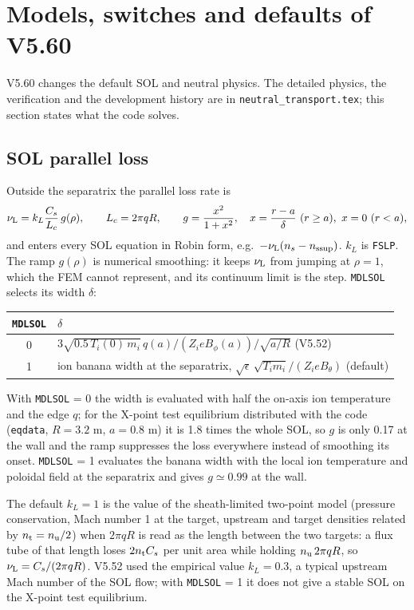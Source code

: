 \documentclass[11pt]{article}
\def\r#1{{\rm#1}}
\def\nsup#1{n_\r{#1sup}}
\def\nuL{\nu_\r{L}}
\begin{document}
\clearpage
\section{Models, switches and defaults of V5.60}
\setcounter{equation}{0}

V5.60 changes the default SOL and neutral physics.  The detailed physics,
the verification and the development history are in
\texttt{neutral\_transport.tex}; this section states what the code solves.

\subsection{SOL parallel loss}

Outside the separatrix the parallel loss rate is
\begin{equation}
  \nuL = k_L \frac{C_s}{L_c}\, g(\rho),\qquad L_c = 2\pi q R,\qquad
  g = \frac{x^2}{1+x^2},\quad x = \frac{r-a}{\delta}\ (r\ge a),\ x=0\ (r<a),
\end{equation}
and enters every SOL equation in Robin form, e.g.\ $-\nuL(n_s-\nsup{s})$.
$k_L$ is \texttt{FSLP}.  The ramp $g(\rho)$ is numerical smoothing: it keeps
$\nuL$ from jumping at $\rho=1$, which the FEM cannot represent, and its
continuum limit is the step.  \texttt{MDLSOL} selects its width $\delta$:

\begin{center}
\begin{tabular}{|c|l|}\hline
\texttt{MDLSOL} & $\delta$ \\\hline
0 & $3\sqrt{0.5\,T_i(0)\,m_i}\,q(a)/(Z_ieB_\phi(a))/\sqrt{a/R}$ (V5.52) \\
1 & ion banana width at the separatrix, $\sqrt{\epsilon}\,\sqrt{T_i m_i}/(Z_i e B_\theta)$ (default) \\\hline
\end{tabular}
\end{center}

With \texttt{MDLSOL} = 0 the width is evaluated with half the on-axis ion
temperature and the edge $q$; for the X-point test equilibrium distributed with
the code (\texttt{eqdata}, $R=3.2$ m, $a=0.8$ m) it is 1.8 times the whole SOL, so
$g$ is only 0.17 at the wall and the ramp suppresses the loss everywhere instead
of smoothing its onset.  \texttt{MDLSOL} = 1 evaluates the banana width with the
local ion temperature and poloidal field at the separatrix and gives
$g\simeq 0.99$ at the wall.

The default $k_L = 1$ is the value of the sheath-limited two-point model
(pressure conservation, Mach number 1 at the target, upstream and target
densities related by $n_\r{t}=n_\r{u}/2$) when $2\pi qR$ is read as the length
between the two targets: a flux tube of that length loses $2n_\r{t}C_s$ per unit
area while holding $n_\r{u}\,2\pi qR$, so $\nuL = C_s/(2\pi qR)$.  V5.52 used the
empirical value $k_L=0.3$, a typical upstream Mach number of the SOL flow; with
\texttt{MDLSOL} = 1 it does not give a stable SOL on the X-point test
equilibrium.
\end{document}
